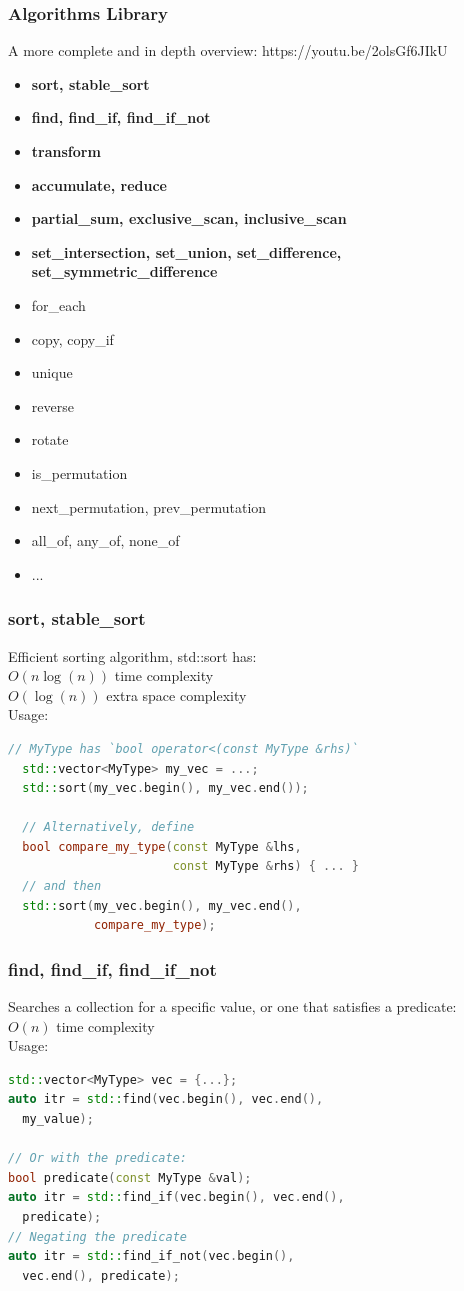 \documentclass{beamer}
\begin{document}
\begin{frame}
  \frametitle{Algorithms Library}
  A more complete and in depth overview: https://youtu.be/2olsGf6JIkU
  \begin{itemize}
    \item {\bf sort, stable\_sort}
    \item {\bf find, find\_if, find\_if\_not}
    \item {\bf transform}
    \item {\bf accumulate, reduce}
    \item {\bf partial\_sum, exclusive\_scan, inclusive\_scan}
    \item {\bf set\_intersection, set\_union, set\_difference, set\_symmetric\_difference}
    \item for\_each
    \item copy, copy\_if
    \item unique
    \item reverse
    \item rotate
    \item is\_permutation
    \item next\_permutation, prev\_permutation
    \item all\_of, any\_of, none\_of
    \item ...
  \end{itemize}
\end{frame}

\begin{frame}[fragile]
  \frametitle{sort, stable\_sort}
  Efficient sorting algorithm, std::sort has:\\
  $O(n \log(n))$ time complexity\\
  $O(\log(n))$ extra space complexity\\
  Usage:
  \begin{lstlisting}[language=C++]
  // MyType has `bool operator<(const MyType &rhs)`
  std::vector<MyType> my_vec = ...;
  std::sort(my_vec.begin(), my_vec.end());

  // Alternatively, define
  bool compare_my_type(const MyType &lhs,
                       const MyType &rhs) { ... }
  // and then
  std::sort(my_vec.begin(), my_vec.end(),
            compare_my_type);
  \end{lstlisting}
\end{frame}

\begin{frame}[fragile]
  \frametitle{find, find\_if, find\_if\_not}
  Searches a collection for a specific value, or one that satisfies a predicate:\\
  $O(n)$ time complexity\\
  Usage:
  \begin{lstlisting}[language=C++]
std::vector<MyType> vec = {...};
auto itr = std::find(vec.begin(), vec.end(),
  my_value);

// Or with the predicate:
bool predicate(const MyType &val);
auto itr = std::find_if(vec.begin(), vec.end(),
  predicate);
// Negating the predicate
auto itr = std::find_if_not(vec.begin(),
  vec.end(), predicate);
  \end{lstlisting}
\end{frame}
\end{document}
